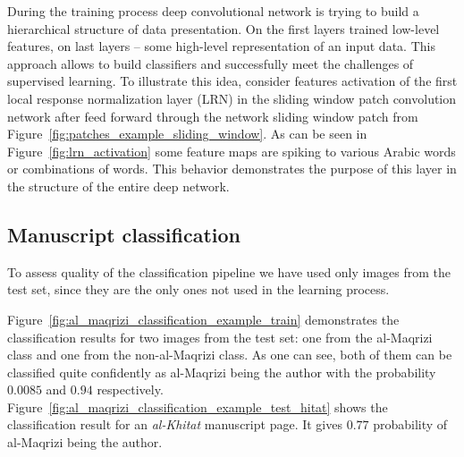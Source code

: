 \documentclass[a4paper,conference]{IEEEtran}
\begin{document}
During the training process deep convolutional network is trying to build a hierarchical structure of data presentation. On the first layers trained low-level features, on last layers -- some high-level representation of an input data. This approach allows to build classifiers and successfully meet the challenges of supervised learning. To illustrate this idea, consider features activation of the first local response normalization layer (LRN) in the sliding window patch convolution network after feed forward through the network sliding window patch from Figure~\ref{fig:patches_example_sliding_window}. As can be seen in Figure~\ref{fig:lrn_activation} some feature maps are spiking to various Arabic words or combinations of words. This behavior demonstrates the purpose of this layer in the structure of the entire deep network.


\subsection{Manuscript classification}

To assess quality of the classification pipeline we have used only images from the test set, since they are the only ones not used in the learning process. 

Figure~\ref{fig:al_maqrizi_classification_example_train} demonstrates the classification results for two images from the test set: one from the al-Maqrizi class and one from the non-al-Maqrizi class. As one can see, both of them can be classified quite confidently as al-Maqrizi being the author with the probability $0.0085$ and $0.94$ respectively. Figure~\ref{fig:al_maqrizi_classification_example_test_hitat} shows the classification result for an {\it al-Khitat} manuscript page. It gives $0.77$ probability of al-Maqrizi being the author.
\end{document}
